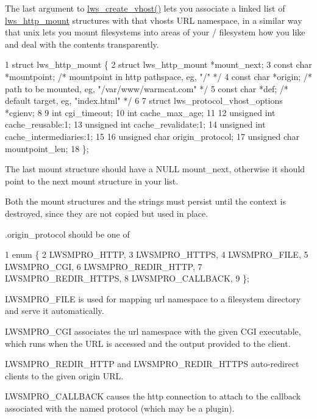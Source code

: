 The last argument to \hyperlink{group__context-and-vhost_ga0c54c667ccd9b8b3dddcd123ca72f87c}{lws\+\_\+create\+\_\+vhost()} lets you associate a linked list of \hyperlink{structlws__http__mount}{lws\+\_\+http\+\_\+mount} structures with that vhost\textquotesingle{}s U\+RL \textquotesingle{}namespace\textquotesingle{}, in a similar way that unix lets you mount filesystems into areas of your / filesystem how you like and deal with the contents transparently.


\begin{DoxyCode}
1 struct lws\_http\_mount \{
2         struct lws\_http\_mount *mount\_next;
3         const char *mountpoint; /* mountpoint in http pathspace, eg, "/" */
4         const char *origin; /* path to be mounted, eg, "/var/www/warmcat.com" */
5         const char *def; /* default target, eg, "index.html" */
6 
7         struct lws\_protocol\_vhost\_options *cgienv;
8 
9         int cgi\_timeout;
10         int cache\_max\_age;
11 
12         unsigned int cache\_reusable:1;
13         unsigned int cache\_revalidate:1;
14         unsigned int cache\_intermediaries:1;
15 
16         unsigned char origin\_protocol;
17         unsigned char mountpoint\_len;
18 \};
\end{DoxyCode}


The last mount structure should have a N\+U\+LL mount\+\_\+next, otherwise it should point to the \textquotesingle{}next\textquotesingle{} mount structure in your list.

Both the mount structures and the strings must persist until the context is destroyed, since they are not copied but used in place.

{\ttfamily .origin\+\_\+protocol} should be one of


\begin{DoxyCode}
1 enum \{
2         LWSMPRO\_HTTP,
3         LWSMPRO\_HTTPS,
4         LWSMPRO\_FILE,
5         LWSMPRO\_CGI,
6         LWSMPRO\_REDIR\_HTTP,
7         LWSMPRO\_REDIR\_HTTPS,
8         LWSMPRO\_CALLBACK,
9 \};
\end{DoxyCode}



\begin{DoxyItemize}
\item L\+W\+S\+M\+P\+R\+O\+\_\+\+F\+I\+LE is used for mapping url namespace to a filesystem directory and serve it automatically.
\item L\+W\+S\+M\+P\+R\+O\+\_\+\+C\+GI associates the url namespace with the given C\+GI executable, which runs when the U\+RL is accessed and the output provided to the client.
\item L\+W\+S\+M\+P\+R\+O\+\_\+\+R\+E\+D\+I\+R\+\_\+\+H\+T\+TP and L\+W\+S\+M\+P\+R\+O\+\_\+\+R\+E\+D\+I\+R\+\_\+\+H\+T\+T\+PS auto-\/redirect clients to the given origin U\+RL.
\item L\+W\+S\+M\+P\+R\+O\+\_\+\+C\+A\+L\+L\+B\+A\+CK causes the http connection to attach to the callback associated with the named protocol (which may be a plugin).
\end{DoxyItemize}

